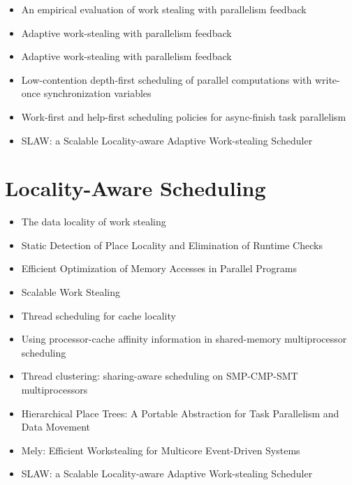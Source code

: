 \begin{itemize}
\item An empirical evaluation of work stealing with parallelism
  feedback \cite{Agrawal2006}
\item Adaptive work-stealing with parallelism feedback
  \cite{Agrawal2008}
\item Adaptive work-stealing with parallelism feedback
  \cite{Agrawal2008a}
\item Low-contention depth-first scheduling of parallel computations
  with write-once synchronization variables \cite{Fatourou2001}
\item Work-first and help-first scheduling policies for async-finish
  task parallelism \cite{Guo2009}
\item SLAW: a Scalable Locality-aware Adaptive Work-stealing Scheduler
  \cite{Guo2010}
\end{itemize}


\section*{Locality-Aware Scheduling}
\label{sec:lr-locality-aware-scheduling}

\begin{itemize}
\item[\checkmark] The data locality of work stealing \cite{Acar2002}
\item Static Detection of Place Locality and Elimination of Runtime
  Checks \cite{Agarwal2008}
\item Efficient Optimization of Memory Accesses in Parallel Programs
  \cite{Barik2009}
\item Scalable Work Stealing \cite{Dinan2009}
\item Thread scheduling for cache locality \cite{Philbin1996}
\item Using processor-cache affinity information in shared-memory
  multiprocessor scheduling \cite{Squillante1993}
\item Thread clustering: sharing-aware scheduling on SMP-CMP-SMT
  multiprocessors \cite{Tam2007}
\item Hierarchical Place Trees: A Portable Abstraction for Task
  Parallelism and Data Movement \cite{Yan2009}
\item Mely: Efficient Workstealing for Multicore Event-Driven Systems
  \cite{Gaud2010}
\item[\checkmark] SLAW: a Scalable Locality-aware Adaptive
  Work-stealing Scheduler \cite{Guo2010}
\end{itemize}



